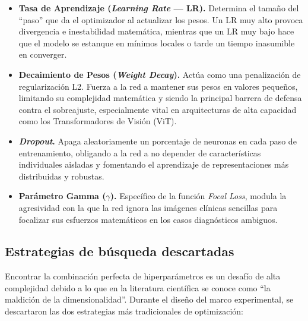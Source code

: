 \begin{itemize}
	\item \textbf{Tasa de Aprendizaje (\textit{Learning Rate} --- LR).} Determina el tamaño del ``paso'' que da el optimizador al actualizar los pesos. Un LR muy alto provoca divergencia e inestabilidad matemática, mientras que un LR muy bajo hace que el modelo se estanque en mínimos locales o tarde un tiempo inasumible en converger.
	
	\item \textbf{Decaimiento de Pesos (\textit{Weight Decay}).} Actúa como una penalización de regularización L2. Fuerza a la red a mantener sus pesos en valores pequeños, limitando su complejidad matemática y siendo la principal barrera de defensa contra el sobreajuste, especialmente vital en arquitecturas de alta capacidad como los Transformadores de Visión (ViT).
	
	\item \textbf{\textit{Dropout}.} Apaga aleatoriamente un porcentaje de neuronas en cada paso de entrenamiento, obligando a la red a no depender de características individuales aisladas y fomentando el aprendizaje de representaciones más distribuidas y robustas.
	
	\item \textbf{Parámetro Gamma ($\gamma$).} Específico de la función \textit{Focal Loss}, modula la agresividad con la que la red ignora las imágenes clínicas sencillas para focalizar sus esfuerzos matemáticos en los casos diagnósticos ambiguos.
\end{itemize}

\subsection{Estrategias de búsqueda descartadas}

Encontrar la combinación perfecta de hiperparámetros es un desafío de alta complejidad debido a lo que en la literatura científica se conoce como ``la maldición de la dimensionalidad''. Durante el diseño del marco experimental, se descartaron las dos estrategias más tradicionales de optimización:

